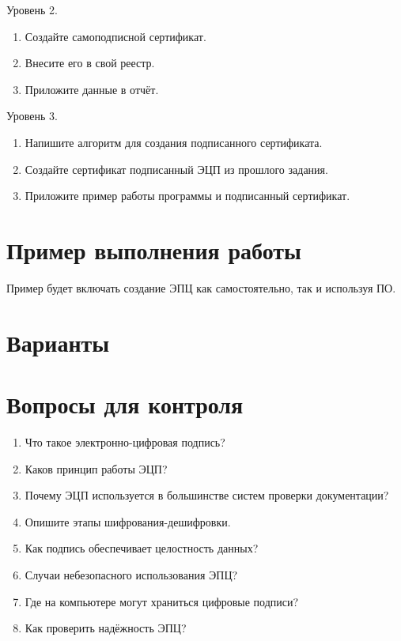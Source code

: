Уровень 2. %

\begin{enumerate}
  \item Создайте самоподписной сертификат.
  \item Внесите его в свой реестр.
  \item Приложите данные в отчёт.
\end{enumerate}

Уровень 3.%

\begin{enumerate}
  \item Напишите алгоритм для создания подписанного сертификата.
  \item Создайте сертификат подписанный ЭЦП из прошлого задания.
  \item Приложите пример работы программы и подписанный сертификат.
\end{enumerate}

\section{Пример выполнения работы}\label{sect4_c}
%
Пример будет включать создание ЭПЦ как самостоятельно, так и используя ПО.
\section{Варианты}\label{sect4_d}
%
\section{Вопросы для контроля}\label{sect4_e}
%
\begin{enumerate}
  \item Что такое электронно-цифровая подпись?
  \item Каков принцип работы ЭЦП?
  \item Почему ЭЦП используется в большинстве систем проверки документации?
  \item Опишите этапы шифрования-дешифровки.
  \item Как подпись обеспечивает целостность данных?
  \item Случаи небезопасного использования ЭПЦ?
  \item Где на компьютере могут храниться цифровые подписи?
  \item Как проверить надёжность ЭПЦ?
\end{enumerate}
